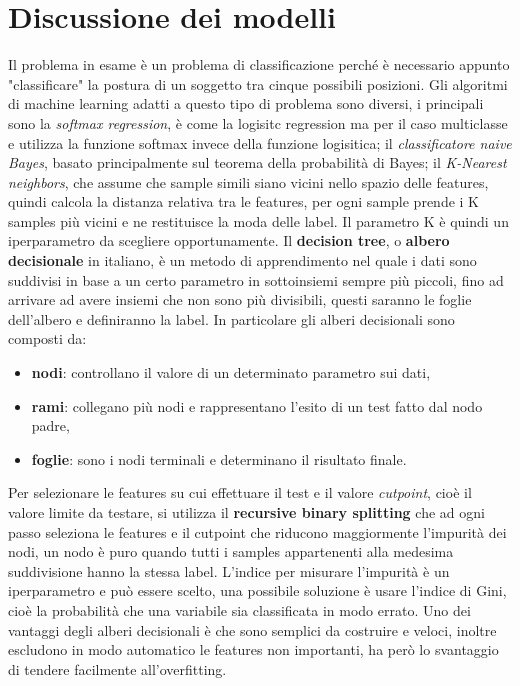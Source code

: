 \section{Discussione dei modelli}\label{sec:modelli}
Il problema in esame è un problema di classificazione perché è necessario appunto "classificare" la postura di un soggetto tra cinque possibili posizioni. Gli algoritmi di machine learning adatti a questo tipo di problema sono diversi, i principali sono la \textit{softmax regression},  è come la logisitc regression ma per il caso multiclasse e utilizza la funzione softmax invece della funzione logisitica; il \textit{classificatore naive Bayes}, basato principalmente sul teorema della probabilità di Bayes; il \textit{K-Nearest neighbors}, che assume che sample simili siano vicini nello spazio delle features, quindi calcola la distanza relativa tra le features, per ogni sample prende i K samples più vicini e ne restituisce la moda delle label. Il parametro K è quindi un iperparametro da scegliere opportunamente. Il \textbf{decision tree}, o \textbf{albero decisionale} in italiano, è un metodo di apprendimento nel quale i dati sono suddivisi in base a un certo parametro in sottoinsiemi sempre più piccoli, fino ad arrivare ad avere insiemi che non sono più divisibili, questi saranno le foglie dell'albero e definiranno la label. In particolare gli alberi decisionali sono composti da:
\begin{itemize}
\item \textbf{nodi}: controllano il valore di un determinato parametro sui dati,
\item \textbf{rami}: collegano più nodi e rappresentano l'esito di un test fatto dal nodo padre,
\item \textbf{foglie}: sono i nodi terminali e determinano il risultato finale.
\end{itemize}

Per selezionare le features su cui effettuare il test e il valore \textit{cutpoint}, cioè il valore limite da testare, si utilizza il \textbf{recursive binary splitting} che ad ogni passo seleziona le features e il cutpoint che riducono maggiormente l'impurità dei nodi, un nodo è puro quando tutti i samples appartenenti alla medesima suddivisione hanno la stessa label.  L'indice per misurare l'impurità è un iperparametro e può essere scelto, una possibile soluzione è usare l'indice di Gini, cioè la probabilità che una variabile sia classificata in modo errato. Uno dei vantaggi degli alberi decisionali è che sono semplici da costruire e veloci, inoltre escludono in modo automatico le features non importanti, ha però lo svantaggio di tendere facilmente all'overfitting. 

